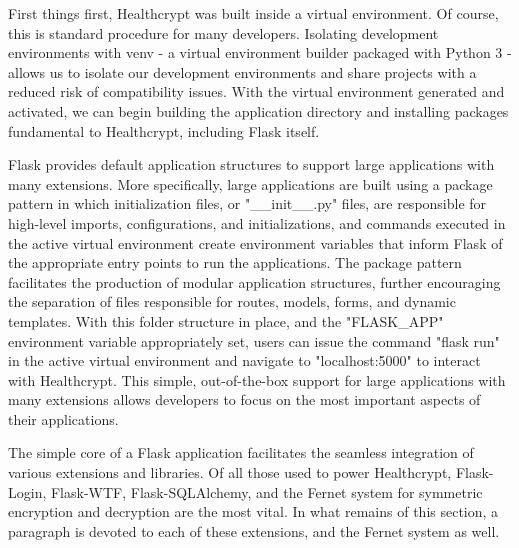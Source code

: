 \documentclass[letterpaper, 10pt,DIV=13]{scrartcl}
\begin{document}
\begin{multicols}{2}
\begin{spacing}{1.25}
First things first, Healthcrypt was built inside a virtual environment. Of course, this is standard procedure for many developers. Isolating development environments with venv - a virtual environment builder packaged with Python 3 - allows us to isolate our development environments and share projects with a reduced risk of compatibility issues. With the virtual environment generated and activated, we can begin building the application directory and installing packages fundamental to Healthcrypt, including Flask itself.

Flask provides default application structures to support large applications with many extensions. More specifically, large applications are built using a package pattern in which initialization files, or "\_\_init\_\_.py" files, are responsible for high-level imports, configurations, and initializations, and commands executed in the active virtual environment create environment variables that inform Flask of the appropriate entry points to run the applications. The package pattern facilitates the production of modular application structures, further encouraging the separation of files responsible for routes, models, forms, and dynamic templates. With this folder structure in place, and the "FLASK\_APP" environment variable appropriately set, users can issue the command "flask run" in the active virtual environment and navigate to "localhost:5000" to interact with Healthcrypt. This simple, out-of-the-box support for large applications with many extensions allows developers to focus on the most important aspects of their applications.

The simple core of a Flask application facilitates the seamless integration of various extensions and libraries. Of all those used to power Healthcrypt, Flask-Login, Flask-WTF, Flask-SQLAlchemy, and the Fernet system for symmetric encryption and decryption are the most vital. In what remains of this section, a paragraph is devoted to each of these extensions, and the Fernet system as well.


\end{spacing}
\end{multicols}
\end{document}
